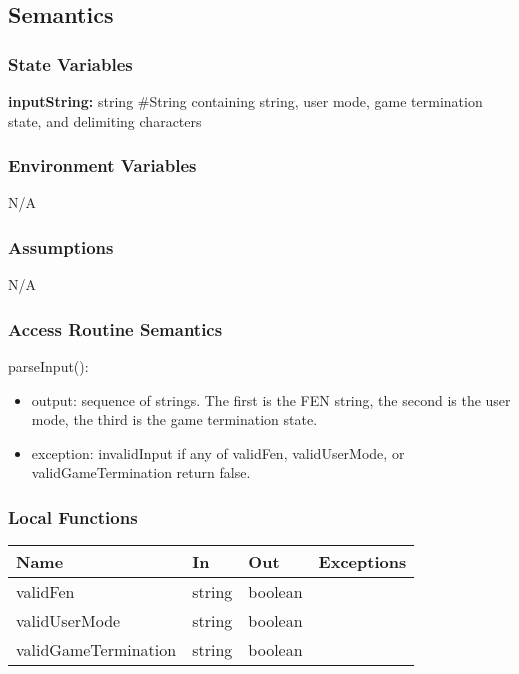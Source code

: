 \documentclass[12pt, titlepage]{article}
\begin{document}
    \subsection{Semantics}
    \subsubsection{State Variables}
    \textbf{inputString:} string \#String containing \cite{FEN} string, user mode, game 
    termination state, and delimiting characters

    \subsubsection{Environment Variables}
        N/A

    \subsubsection{Assumptions}
        N/A
    
    \subsubsection{Access Routine Semantics}
        \noindent parseInput():
        \begin{itemize}
        \item output: sequence of strings. The first is the FEN string, the second is 
            the user mode, the third is the game termination state.
        \item exception: invalidInput if any of validFen, validUserMode, 
            or validGameTermination return false.
        \end{itemize}

    \subsubsection{Local Functions}
        \begin{center}
        \begin{tabular}{p{4.5cm} p{3cm} p{4cm} p{2.5cm}}
        \hline
        \textbf{Name} & \textbf{In} & \textbf{Out} & \textbf{Exceptions} \\
        \hline
        validFen & string & boolean & \\
        \hline
        validUserMode & string & boolean & \\
        \hline
        validGameTermination & string & boolean & \\
        \end{tabular}
        \end{center}
    
\end{document}
